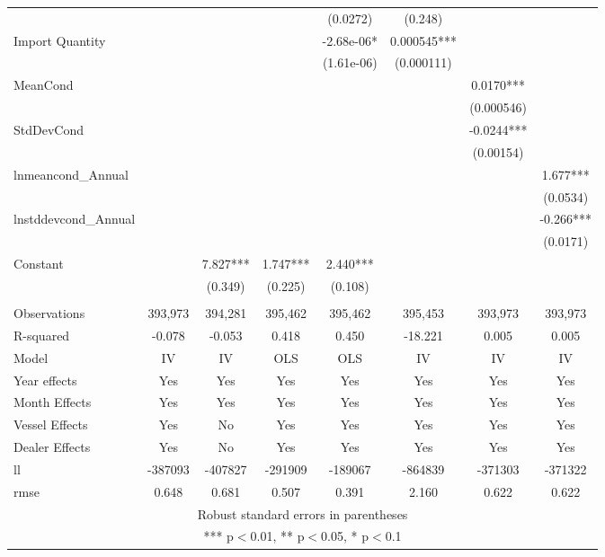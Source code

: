 \begin{tabular}{lccccccc}
 &  &  &  & (0.0272) & (0.248) &  &  \\
Import Quantity &  &  &  & -2.68e-06* & 0.000545*** &  &  \\
 &  &  &  & (1.61e-06) & (0.000111) &  &  \\
MeanCond &  &  &  &  &  & 0.0170*** &  \\
 &  &  &  &  &  & (0.000546) &  \\
StdDevCond &  &  &  &  &  & -0.0244*** &  \\
 &  &  &  &  &  & (0.00154) &  \\
lnmeancond\_Annual &  &  &  &  &  &  & 1.677*** \\
 &  &  &  &  &  &  & (0.0534) \\
lnstddevcond\_Annual &  &  &  &  &  &  & -0.266*** \\
 &  &  &  &  &  &  & (0.0171) \\
Constant &  & 7.827*** & 1.747*** & 2.440*** &  &  &  \\
 &  & (0.349) & (0.225) & (0.108) &  &  &  \\
 &  &  &  &  &  &  &  \\
Observations & 393,973 & 394,281 & 395,462 & 395,462 & 395,453 & 393,973 & 393,973 \\
R-squared & -0.078 & -0.053 & 0.418 & 0.450 & -18.221 & 0.005 & 0.005 \\
Model & IV & IV & OLS & OLS & IV & IV & IV \\
Year effects & Yes & Yes & Yes & Yes & Yes & Yes & Yes \\
Month Effects & Yes & Yes & Yes & Yes & Yes & Yes & Yes \\
Vessel Effects & Yes & No & Yes & Yes & Yes & Yes & Yes \\
Dealer Effects & Yes & No & Yes & Yes & Yes & Yes & Yes \\
ll & -387093 & -407827 & -291909 & -189067 & -864839 & -371303 & -371322 \\
 rmse & 0.648 & 0.681 & 0.507 & 0.391 & 2.160 & 0.622 & 0.622 \\ \hline
\multicolumn{8}{c}{ Robust standard errors in parentheses} \\
\multicolumn{8}{c}{ *** p$<$0.01, ** p$<$0.05, * p$<$0.1} \\
\end{tabular}
